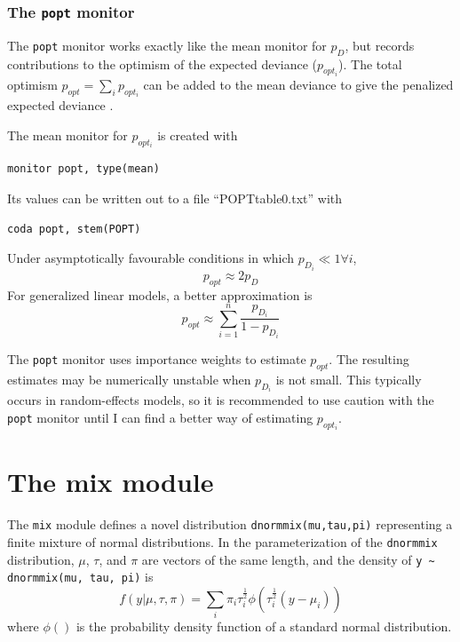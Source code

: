 \documentclass[11pt, a4paper, titlepage]{report}
\begin{document}
\subsection{The \texttt{popt} monitor}

The \texttt{popt} monitor works exactly like the mean monitor for $p_D$,
but records contributions to the optimism of the expected deviance
($p_{opt_i}$). The total optimism $p_{opt} = \sum_i p_{opt_i}$  can be
added to the mean deviance to give the penalized expected deviance
\citep{plummer:2008}.

The mean monitor for $p_{opt_i}$ is created with
\begin{verbatim}
monitor popt, type(mean)
\end{verbatim}
Its values can be written out to a file ``POPTtable0.txt'' with
\begin{verbatim}
coda popt, stem(POPT)
\end{verbatim}
Under asymptotically favourable conditions in which $p_{D_i} \ll 1
\forall i$,
\[
p_{opt} \approx 2 p_D
\]
For generalized linear models, a better approximation is
\[
p_{opt} \approx \sum_{i=1}^n \frac {p_{D_i}}{1 - p_{D_i}}
\]

The \texttt{popt} monitor uses importance weights to estimate
$p_{opt}$. The resulting estimates may be numerically unstable when
$p_{D_i}$ is not small.  This typically occurs in random-effects
models, so it is recommended to use caution with the \texttt{popt}
monitor until I can find a better way of estimating $p_{opt_i}$.

\chapter{The mix module}


The \texttt{mix} module defines a novel distribution
\verb+dnormmix(mu,tau,pi)+ representing a finite mixture of normal
distributions. In the parameterization of the \verb+dnormmix+
distribution, $\mu$, $\tau$, and $\pi$ are vectors of the same length,
and the density of \verb+y ~ dnormmix(mu, tau, pi)+ is
\[
f(y | \mu, \tau, \pi) = \sum_i \pi_i \tau_i^{\frac{1}{2}} \phi( \tau^{\frac{1}{2}}_i (y - \mu_i))
\]
where $\phi()$ is the probability density function of a standard
normal distribution.
\end{document}
